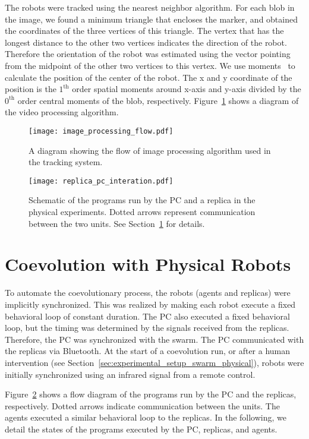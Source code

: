 The robots were tracked using the nearest neighbor algorithm. For each blob in the image, we found a minimum triangle that encloses the marker, and obtained the coordinates of the three vertices of this triangle. The vertex that has the longest distance to the other two vertices indicates the direction of the robot. Therefore the orientation of the robot was estimated using the vector pointing from the midpoint of the other two vertices to this vertex. We use moments~\citep{Hu1962} to calculate the position of the center of the robot. The x and y coordinate of the position is the $1^\mathrm{th}$ order spatial moments around x-axis and y-axis divided by the $0^\mathrm{th}$ order central moments of the blob, respectively. Figure~\ref{fig:image_processing_flow} shows a diagram of the video processing algorithm. 
%
\begin{figure}[!t]
    \centering
    \texttt{[image: image\_processing\_flow.pdf]}
    \caption{A diagram showing the flow of image processing algorithm used in the tracking system.}
    \label{fig:image_processing_flow}
\end{figure} 
%
%
\begin{figure}[!t]
    \centering
    \texttt{[image: replica\_pc\_interation.pdf]}
    \caption{Schematic of the programs run by the PC and a replica in the physical experiments. Dotted arrows represent communication between the two units. See Section~\ref{sec:coevolution_physical_robots_swarm_physical} for details.}
    \label{fig:agent_pc_interation}
\end{figure} 
%
\section{Coevolution with Physical Robots}\label{sec:coevolution_physical_robots_swarm_physical}

To automate the coevolutionary process, the robots (agents and replicas) were implicitly synchronized. This was realized by making each robot execute a fixed behavioral loop of constant duration. The PC also executed a fixed behavioral loop, but the timing was determined by the signals received from the replicas. Therefore, the PC was synchronized with the swarm. The PC communicated with the replicas via Bluetooth. At the start of a coevolution run, or after a human intervention (see Section~\ref{sec:experimental_setup_swarm_physical}), robots were initially synchronized using an infrared signal from a remote control.

Figure~\ref{fig:agent_pc_interation} shows a flow diagram of the programs run by the PC and the replicas, respectively. Dotted arrows indicate communication between the units. The agents executed a similar behavioral loop to the replicas. In the following, we detail the states of the programs executed by the PC, replicas, and agents.

